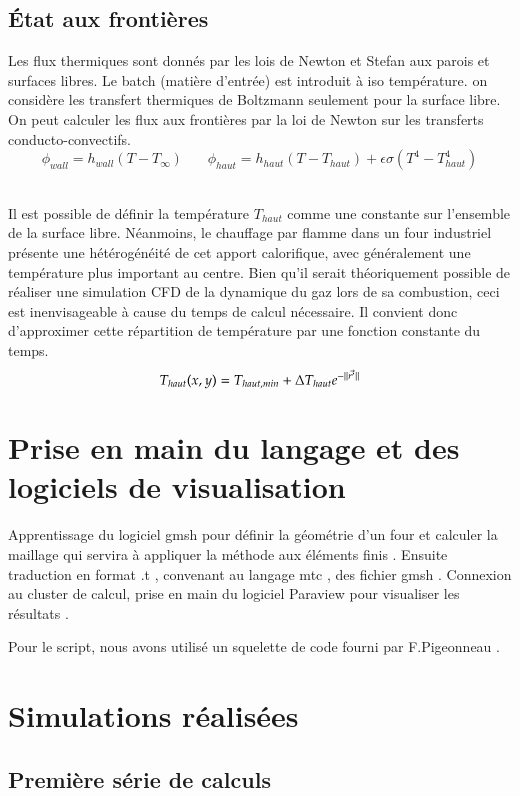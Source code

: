 \documentclass[12pt, a4paper, french, BCOR = 0pt, DIV = 10]{scrartcl}
\begin{document}
	\subsection{État aux frontières}
	
	Les flux thermiques sont donnés par les lois de Newton et Stefan aux parois et surfaces libres. Le batch (matière d'entrée) est introduit à iso température. on considère les transfert thermiques de Boltzmann seulement pour la surface libre.
	On peut calculer les flux aux frontières par la loi de Newton sur les transferts conducto-convectifs.\\ 
	\centering
	$$
	\phi_{wall} = h_{wall} (T - T_{\infty}) ~~~~~~~~	
	\phi_{haut} = h_{haut} (T - T_{haut}) + \epsilon \sigma (T^4 - T_{haut}^4)
	$$
    \\[0.5 cm]
    \raggedright
    Il est possible de définir la température $T_{haut}$ comme une constante sur l'ensemble de la surface libre. Néanmoins, le chauffage par flamme dans un four industriel présente une hétérogénéité de cet apport calorifique, avec généralement une température plus important au centre. Bien qu'il serait théoriquement possible de réaliser une simulation CFD de la dynamique du gaz lors de sa combustion, ceci est inenvisageable à cause du temps de calcul nécessaire. Il convient donc d'approximer cette répartition de température par une fonction constante du temps.
    $$
        T_{haut}(x, y) = T_{haut, min} + \Delta T_{haut} \space e^{-||\vec{r^{\prime}}||}
    $$
	
	\section{Prise en main du langage et des logiciels de visualisation}
 	\raggedright
	Apprentissage du logiciel gmsh pour définir la géométrie d'un four et calculer la maillage qui servira à appliquer la méthode aux éléments finis . Ensuite traduction en format .t , convenant au langage mtc , des fichier gmsh . 
	Connexion au cluster de calcul, prise en main du logiciel Paraview pour visualiser les résultats .
	
	Pour le script, nous avons utilisé un squelette de code fourni par F.Pigeonneau .
	
	\section{Simulations réalisées}
	
	\subsection{Première série de calculs}
\end{document}
